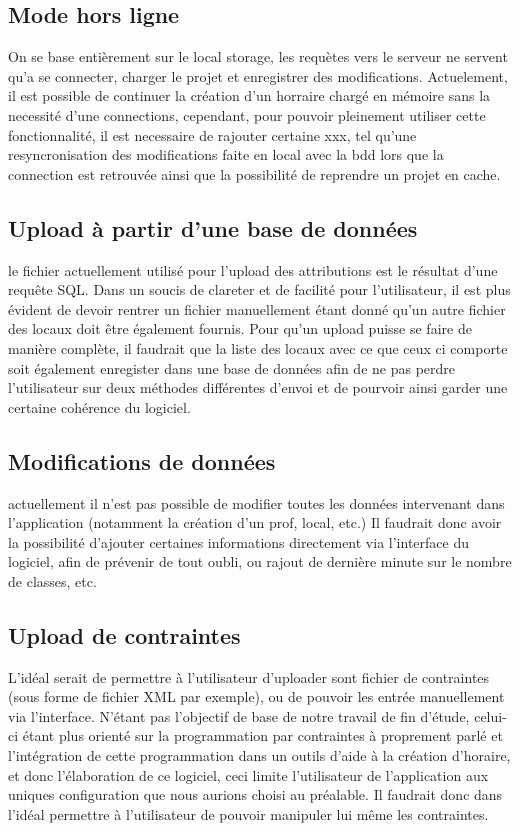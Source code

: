\subsection{Mode hors ligne}
On se base entièrement sur le local storage, les requètes vers le serveur ne
servent qu'a se connecter, charger le projet et enregistrer des modifications.
Actuelement, il est possible de continuer la création d'un horraire chargé en
mémoire sans la necessité d'une connections, cependant, pour pouvoir pleinement
utiliser cette fonctionnalité, il est necessaire de rajouter certaine xxx, tel
qu'une resyncronisation des modifications faite en local avec la bdd lors que la
connection est retrouvée ainsi que la possibilité de reprendre un projet en
cache.

\subsection{Upload à partir d'une base de données}
le fichier actuellement utilisé pour l'upload des attributions est le résultat d'une requête SQL. Dans un soucis de clareter et de facilité pour l'utilisateur, il est plus évident de devoir rentrer un fichier manuellement étant donné qu'un autre fichier des locaux doit être également fournis. Pour qu'un upload puisse se faire de manière complète, il faudrait que la liste des locaux avec ce que ceux ci comporte soit également enregister dans une base de données afin de ne pas perdre l'utilisateur sur deux méthodes différentes d'envoi et de pourvoir ainsi garder une certaine cohérence du logiciel.

\subsection{Modifications de données}
actuellement il n'est pas possible de modifier toutes les données intervenant
dans l'application (notamment la création d'un prof, local, etc.) Il faudrait donc avoir la possibilité d'ajouter certaines informations directement via l'interface du logiciel, afin de prévenir de tout oubli, ou rajout de dernière minute sur le nombre de classes, etc.

\subsection{Upload de contraintes}
L'idéal serait de permettre à l'utilisateur d'uploader sont fichier de contraintes (sous forme de fichier XML par exemple), ou de pouvoir les entrée manuellement via l'interface. N'étant pas l'objectif de base de notre travail de fin d'étude, celui-ci étant plus orienté sur la programmation par contraintes à proprement parlé et l'intégration de cette programmation dans un outils d'aide à la création d'horaire, et donc l'élaboration de ce logiciel, ceci limite l'utilisateur de l'application aux uniques configuration que nous aurions choisi au préalable. Il faudrait donc dans l'idéal permettre à l'utilisateur de pouvoir manipuler lui même les contraintes.